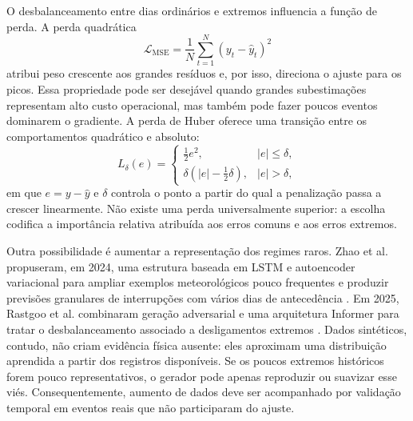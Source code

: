 O desbalanceamento entre dias ordinários e extremos influencia a função de perda. A perda quadrática
\begin{equation}
    \mathcal{L}_{\mathrm{MSE}}
    =\frac{1}{N}\sum_{t=1}^{N}(y_t-\hat{y}_t)^2
\end{equation}
atribui peso crescente aos grandes resíduos e, por isso, direciona o ajuste para os picos. Essa propriedade pode ser desejável quando grandes subestimações representam alto custo operacional, mas também pode fazer poucos eventos dominarem o gradiente. A perda de Huber oferece uma transição entre os comportamentos quadrático e absoluto:
\begin{equation}
L_{\delta}(e)=
\begin{cases}
\frac{1}{2}e^2, & |e|\leq\delta,\\
\delta\left(|e|-\frac{1}{2}\delta\right), & |e|>\delta,
\end{cases}
\label{eq:huber}
\end{equation}
em que $e=y-\hat{y}$ e $\delta$ controla o ponto a partir do qual a penalização passa a crescer linearmente. Não existe uma perda universalmente superior: a escolha codifica a importância relativa atribuída aos erros comuns e aos erros extremos.

Outra possibilidade é aumentar a representação dos regimes raros. Zhao et al. propuseram, em 2024, uma estrutura baseada em LSTM e autoencoder variacional para ampliar exemplos meteorológicos pouco frequentes e produzir previsões granulares de interrupções com vários dias de antecedência \cite{zhao2024variational}. Em 2025, Rastgoo et al. combinaram geração adversarial e uma arquitetura Informer para tratar o desbalanceamento associado a desligamentos extremos \cite{rastgoo2025extreme}. Dados sintéticos, contudo, não criam evidência física ausente: eles aproximam uma distribuição aprendida a partir dos registros disponíveis. Se os poucos extremos históricos forem pouco representativos, o gerador pode apenas reproduzir ou suavizar esse viés. Consequentemente, aumento de dados deve ser acompanhado por validação temporal em eventos reais que não participaram do ajuste.

